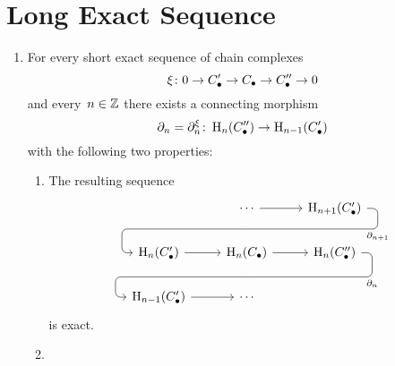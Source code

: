 \section{Long Exact Sequence}


\begin{theorem}
  \leavevmode
  \begin{enumerate}
    \item
      For every short exact sequence of chain complexes
      \[
        \xi
        \colon
        0
        \to
        C_\bullet'
        \to
        C_\bullet
        \to
        C_\bullet''
        \to
        0
      \]
      and every~$n \in \mathbb{Z}$ there exists a connecting morphism
      \[
        \partial_n
        =
        \partial_n^\xi
        \colon
        \operatorname{H}_n(C_\bullet'')
        \to
        \operatorname{H}_{n-1}(C_\bullet')
      \]
      with the following two properties:
      \begin{enumerate}
        \item
          The resulting sequence
          \[
            \begin{tikzcd}
                {}
              & \dotsb
                \arrow{r}
                \arrow[d, phantom, ""{coordinate, name=Y}]
              & \Hl_{n+1}(\Ccc')
                \arrow[ dll,
                        "\del_{n+1}",
                        rounded corners,
                        to path={ -- ([xshift=2ex]\tikztostart.east)
                                  |- (Y) \tikztonodes
                                  -| ([xshift=-2ex]\tikztotarget.west)
                                  -- (\tikztotarget)}
                      ]
              \\
                \Hl_n(\Ccc')
                \arrow{r}
              & \Hl_n(\Ccc)
                \arrow{r}
                \arrow[d, phantom, ""{coordinate, name=Z}]
              & \Hl_n(\Ccc'')
                \arrow[ dll,
                        "\del_n",
                        rounded corners,
                        to path={ -- ([xshift=2ex]\tikztostart.east)
                                  |- (Z) \tikztonodes
                                  -| ([xshift=-2ex]\tikztotarget.west)
                                  -- (\tikztotarget)}
                      ]
              \\
                \Hl_{n-1}(\Ccc')
                \arrow{r}
              & \dotsb
              & {}
            \end{tikzcd}
          \]
          is exact.
        \item

\end{enumerate}
\end{enumerate}
\end{theorem}
